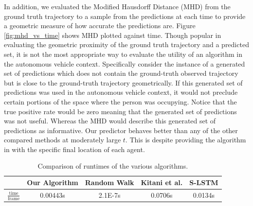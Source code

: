\documentclass[letterpaper,10pt,conference]{ieeetran}
\begin{document}
	In addition, we evaluated the Modified Hausdorff Distance (MHD) \cite{Dubuisson1994} from the ground truth trajectory to a sample from the predictions at each time to provide a geometric measure of how accurate the predictions are. 
	Figure \ref{fig:mhd_vs_time} shows MHD plotted against time.
	Though popular in evaluating the geometric proximity of the ground truth trajectory and a predicted set, it is not the most appropriate way to evaluate the utility of an algorithm in the autonomous vehicle context. 
	Specifically consider the instance of a generated set of predictions which does not contain the ground-truth observed trajectory but is close to the ground-truth trajectory geometrically. 
	If this generated set of predictions was used in the autonomous vehicle context, it would not preclude certain portions of the space where the person was occupying. 
	Notice that the true positive rate would be zero meaning that the generated set of predictions was not useful.
	Whereas the MHD would describe this generated set of predictions as informative.
Our predictor behaves better than any of the other compared methods at moderately large $t$.
This is despite providing the algorithm in \cite{Kitani2012} with the specific final location of each agent.

\begin{table}
	\begin{center}
		\caption{Comparison of runtimes of the various algorithms.}
		\label{tab:time}
		\renewcommand{\arraystretch}{1.5}%
		\begin{tabular}{||c | c c  c c ||} 
			\hline
			& Our Algorithm & Random Walk & Kitani et al. & S-LSTM \\ [0.5ex] 
			\hline 
			$\frac{\mathrm{time}}{\mathrm{frame}}$ & 0.00443s & 2.1E-7s & 0.0706s & 0.0134s \\
			\hline
		\end{tabular}
	\end{center}
	\vspace*{-0.6cm}
\end{table}
\end{document}
